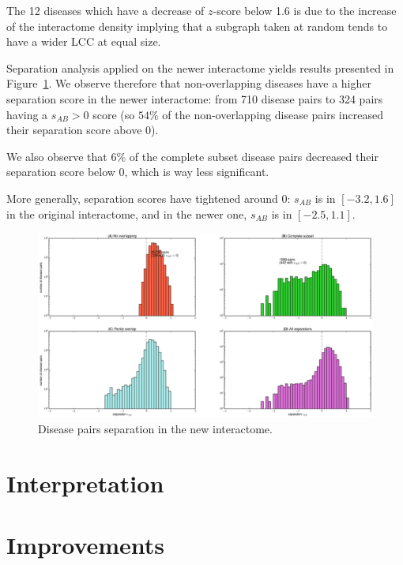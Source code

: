 \documentclass[letterpaper]{article}
\begin{document}
	The 12 diseases which have a decrease of $z$-score below 1.6 is due to the increase of the interactome density implying
	that a subgraph taken at random tends to have a wider LCC at equal size.

	Separation analysis applied on the newer interactome yields results presented in Figure~\ref{fig:new interactome s_AB}.
	We observe therefore that non-overlapping diseases have a higher separation score in the newer interactome: from 710
	disease pairs to 324 pairs having a $s_{AB} > 0$ score (so $54\%$ of the non-overlapping disease pairs increased their
	separation score above 0).

	We also observe that $6\%$ of the complete subset disease pairs decreased their separation score below 0, which is way
	less significant.

	More generally, separation scores have tightened around 0: $s_{AB}$ is in $[-3.2, 1.6]$ in the original interactome, and
	in the newer one, $s_{AB}$ is in $[-2.5, 1.1]$.

	\begin{figure}[!t]
		\hspace{-1.8cm}
		\includegraphics[scale=.35]{images/new_interactome_s_AB_histogram.eps}
		\caption{Disease pairs separation in the new interactome.\label{fig:new interactome s_AB}}
	\end{figure}

\section{Interpretation}

\section{Improvements}
\end{document}
